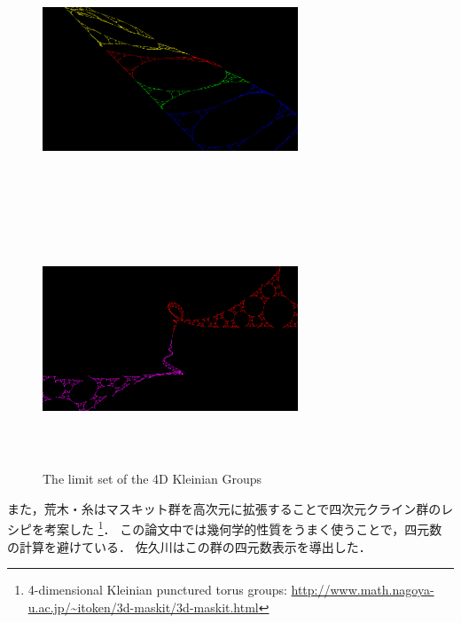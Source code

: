 \begin{figure}[h!tbp]
\begin{minipage}{0.49\hsize}
  \subcaption{}
 \end{minipage}
 \begin{minipage}{0.49\hsize}
  \center
  \includegraphics[width=3in, height=3in, keepaspectratio]{../img/klein/sakugawa3.pdf}
  \subcaption{}
 \end{minipage}
 \hspace*{\fill}
 \begin{minipage}{0.49\hsize}
  \center
  \includegraphics[width=3in, height=3in, keepaspectratio]{../img/klein/sakugawa4.pdf}
  \subcaption{}
 \end{minipage}
 \caption{The limit set of the 4D Kleinian Groups}
 \label{fig:sakugawa}
\end{figure}

また，荒木・糸はマスキット群を高次元に拡張することで四次元クライン群のレ
シピを考案した\cite{araki2008extension}
\footnote{4-dimensional Kleinian punctured torus groups:
\url{http://www.math.nagoya-u.ac.jp/~itoken/3d-maskit/3d-maskit.html}}．
この論文中では幾何学的性質をうまく使うことで，四元数の計算を避けている．
佐久川はこの群の四元数表示を導出した\cite{sakugawa2010limit}．

